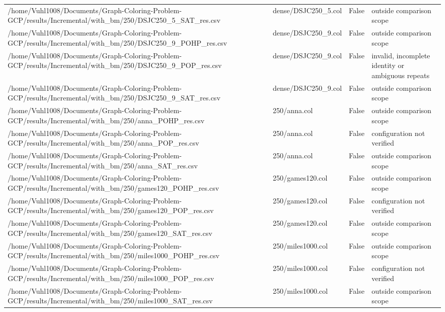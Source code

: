 \begin{table}[htbp]
\begin{tabular}{llll}
/home/Vuhl1008/Documents/Graph-Coloring-Problem-GCP/results/Incremental/with\_bm/250/DSJC250\_5\_SAT\_res.csv & dense/DSJC250\_5.col & False & outside comparison scope \\
/home/Vuhl1008/Documents/Graph-Coloring-Problem-GCP/results/Incremental/with\_bm/250/DSJC250\_9\_POHP\_res.csv & dense/DSJC250\_9.col & False & outside comparison scope \\
/home/Vuhl1008/Documents/Graph-Coloring-Problem-GCP/results/Incremental/with\_bm/250/DSJC250\_9\_POP\_res.csv & dense/DSJC250\_9.col & False & invalid, incomplete identity or ambiguous repeats \\
/home/Vuhl1008/Documents/Graph-Coloring-Problem-GCP/results/Incremental/with\_bm/250/DSJC250\_9\_SAT\_res.csv & dense/DSJC250\_9.col & False & outside comparison scope \\
/home/Vuhl1008/Documents/Graph-Coloring-Problem-GCP/results/Incremental/with\_bm/250/anna\_POHP\_res.csv & 250/anna.col & False & outside comparison scope \\
/home/Vuhl1008/Documents/Graph-Coloring-Problem-GCP/results/Incremental/with\_bm/250/anna\_POP\_res.csv & 250/anna.col & False & configuration not verified \\
/home/Vuhl1008/Documents/Graph-Coloring-Problem-GCP/results/Incremental/with\_bm/250/anna\_SAT\_res.csv & 250/anna.col & False & outside comparison scope \\
/home/Vuhl1008/Documents/Graph-Coloring-Problem-GCP/results/Incremental/with\_bm/250/games120\_POHP\_res.csv & 250/games120.col & False & outside comparison scope \\
/home/Vuhl1008/Documents/Graph-Coloring-Problem-GCP/results/Incremental/with\_bm/250/games120\_POP\_res.csv & 250/games120.col & False & configuration not verified \\
/home/Vuhl1008/Documents/Graph-Coloring-Problem-GCP/results/Incremental/with\_bm/250/games120\_SAT\_res.csv & 250/games120.col & False & outside comparison scope \\
/home/Vuhl1008/Documents/Graph-Coloring-Problem-GCP/results/Incremental/with\_bm/250/miles1000\_POHP\_res.csv & 250/miles1000.col & False & outside comparison scope \\
/home/Vuhl1008/Documents/Graph-Coloring-Problem-GCP/results/Incremental/with\_bm/250/miles1000\_POP\_res.csv & 250/miles1000.col & False & configuration not verified \\
/home/Vuhl1008/Documents/Graph-Coloring-Problem-GCP/results/Incremental/with\_bm/250/miles1000\_SAT\_res.csv & 250/miles1000.col & False & outside comparison scope \\

\end{tabular}
\end{table}
